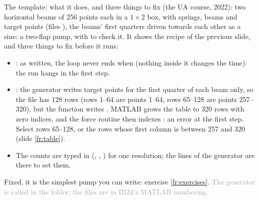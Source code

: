 \documentclass[aspectratio=169,11pt]{beamer}
\newcommand{\sourcecredit}[1]{\vfill\hfill{\tiny\textcolor{DarkGray}{#1}}}
\begin{document}
\begin{frame}{The template: what it does, and three things to fix}
\label{fr:twobeams2}
\small
{} (the UA course, 2022): two horizontal beams of 256 points each in a $1 \times 2$ box, with springs, beams and target points (files ), the beams' first quarters driven towards each other as a sine: a two-flap pump, with  to check it. It shows the recipe of the previous slide, and three things to fix before it runs:
\begin{itemize}
  \item {}: as written, the loop never ends when  (nothing inside it changes the time): the run hangs in the first step.
  \item {}: the generator writes target points for the first quarter of each beam only, so the  file has 128 rows (rows 1--64 are points 1--64, rows 65--128 are points 257--320), but the function writes . MATLAB grows the table to 320 rows with zero indices, and the force routine then indexes : an error at the first step. Select rows 65--128, or the rows whose first column is between 257 and 320 (slide \ref{fr:table}).
  \item The counts are typed in (, , ) for one resolution; the  lines of the generator are there to set them.
\end{itemize}
Fixed, it is the simplest pump you can write: exercise \ref{fr:exercises}.
\sourcecredit{The generator is called  in the folder; the files are in IB2d's MATLAB numbering.}
\end{frame}
\end{document}
